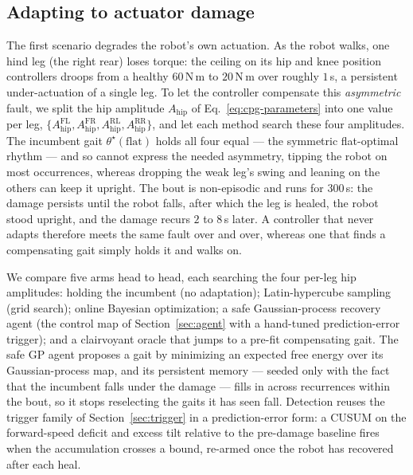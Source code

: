 \documentclass[letterpaper, 10 pt, conference]{ieeeconf}  %
\begin{document}
\iffalse  %
\subsection{Adapting to actuator damage}
\label{sec:exp-damage}

The first scenario degrades the robot's own actuation.
As the robot walks, one hind leg (the right rear) loses torque: the ceiling on its hip and knee position controllers droops from a healthy $60$\,N\,m to $20$\,N\,m over roughly $1$\,s, a persistent under-actuation of a single leg.
To let the controller compensate this \emph{asymmetric} fault, we split the hip amplitude $A_{\text{hip}}$ of Eq.~\ref{eq:cpg-parameters} into one value per leg, $\{A_{\text{hip}}^{\text{FL}}, A_{\text{hip}}^{\text{FR}}, A_{\text{hip}}^{\text{RL}}, A_{\text{hip}}^{\text{RR}}\}$, and let each method search these four amplitudes.
The incumbent gait $\theta^{\star}(\text{flat})$ holds all four equal --- the symmetric flat-optimal rhythm --- and so cannot express the needed asymmetry, tipping the robot on most occurrences, whereas dropping the weak leg's swing and leaning on the others can keep it upright.
The bout is non-episodic and runs for $300$\,s: the damage persists until the robot falls, after which the leg is healed, the robot stood upright, and the damage recurs $2$ to $8$\,s later.
A controller that never adapts therefore meets the same fault over and over, whereas one that finds a compensating gait simply holds it and walks on.

We compare five arms head to head, each searching the four per-leg hip amplitudes: holding the incumbent (no adaptation); Latin-hypercube sampling (grid search); online Bayesian optimization; a safe Gaussian-process recovery agent (the control map of Section~\ref{sec:agent} with a hand-tuned prediction-error trigger); and a clairvoyant oracle that jumps to a pre-fit compensating gait.
The safe GP agent proposes a gait by minimizing an expected free energy over its Gaussian-process map, and its persistent memory --- seeded only with the fact that the incumbent falls under the damage --- fills in across recurrences within the bout, so it stops reselecting the gaits it has seen fall.
Detection reuses the trigger family of Section~\ref{sec:trigger} in a prediction-error form: a CUSUM on the forward-speed deficit and excess tilt relative to the pre-damage baseline fires when the accumulation crosses a bound, re-armed once the robot has recovered after each heal.
\end{document}
